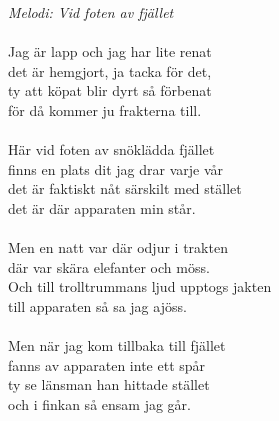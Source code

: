 {\footnotesize\textit{Melodi: Vid foten av fjället}}\\
\\
Jag är lapp och jag har lite renat\\
det är hemgjort, ja tacka för det,\\
ty att köpat blir dyrt så förbenat\\
för då kommer ju frakterna till.\\
\\
Här vid foten av snöklädda fjället\\
finns en plats dit jag drar varje vår\\
det är faktiskt nåt särskilt med stället\\
det är där apparaten min står.\\
\\
Men en natt var där odjur i trakten\\
där var skära elefanter och möss.\\
Och till trolltrummans ljud upptogs jakten\\
till apparaten så sa jag ajöss.\\
\\
Men när jag kom tillbaka till fjället\\
fanns av apparaten inte ett spår\\
ty se länsman han hittade stället\\
och i finkan så ensam jag går.
